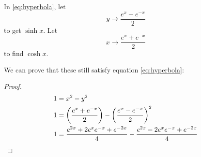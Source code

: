 In \ref{eq:hyperbola}, let \[ y \to \frac{e^x-e^{-x}}{2}\] to get \(\sinh x\).
Let \[ x \to \frac{e^x+e^{-x}}{2}\] to find \(\cosh x\).

We can prove that these still satisfy equation \ref{eq:hyperbola}:

\begin{proof}
  \begin{align*}
    1&=x^2-y^2 \\
    1&=\left( \frac{e^x+e^{-x}}{2} \right) - \left( \frac{e^x - e^{-x}}{2}
    \right)^2 \\
    1&=\frac{e^{2x}+2e^xe^{-x}+e^{-2x}}{4}-\frac{e^{2x}-2e^xe^{-x}+e^{-2x}}{4}
    \qedhere
  \end{align*}
\end{proof}

